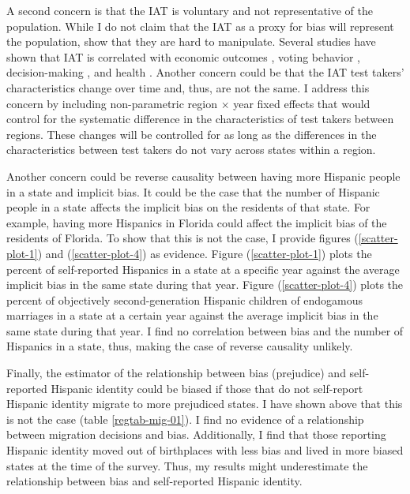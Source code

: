\documentclass[12pt,english]{article}
\begin{document}
A second concern is that the IAT is voluntary and not representative of the population. While I do not claim that the IAT  as a proxy for bias will represent the population, \textcite{egloffPredictiveValidityImplicit2002} show that they are hard to manipulate. Several studies have shown that IAT is correlated with economic outcomes \autocite{chettyRaceEconomicOpportunity2020,gloverDiscriminationSelfFulfillingProphecy2017}, voting behavior \autocite{friesePredictingVotingBehavior2007}, decision-making \autocite{bertrandImplicitDiscrimination2005,carlanaImplicitStereotypesEvidence2019}, and health \autocite{leitnerRacialBiasAssociated2016}. Another concern could be that the IAT test takers' characteristics change over time and, thus, are not the same. I address this concern by including non-parametric region $\times$ year fixed effects that would control for the systematic difference in the characteristics of test takers between regions. These changes will be controlled for as long as the differences in the characteristics between test takers do not vary across states within a region. 

Another concern could be reverse causality between having more Hispanic people in a state and implicit bias. It could be the case that the number of Hispanic people in a state affects the implicit bias on the residents of that state. For example, having more Hispanics in Florida could affect the implicit bias of the residents of Florida. To show that this is not the case, I provide figures (\ref{scatter-plot-1}) and (\ref{scatter-plot-4}) as evidence. Figure (\ref{scatter-plot-1}) plots the percent of self-reported Hispanics in a state at a specific year against the average implicit bias in the same state during that year. Figure (\ref{scatter-plot-4}) plots the percent of objectively second-generation Hispanic children of endogamous marriages in a state at a certain year against the average implicit bias in the same state during that year. I find no correlation between bias and the number of Hispanics in a state, thus, making the case of reverse causality unlikely. 

Finally, the estimator of the relationship between bias (prejudice) and self-reported Hispanic identity could be biased if those that do not self-report Hispanic identity migrate to more prejudiced states. I have shown above that this is not the case (table \ref{regtab-mig-01}). I find no evidence of a relationship between migration decisions and bias. Additionally, I find that those reporting Hispanic identity moved out of birthplaces with less bias and lived in more biased states at the time of the survey. Thus, my results might underestimate the relationship between bias and self-reported Hispanic identity.
\end{document}
